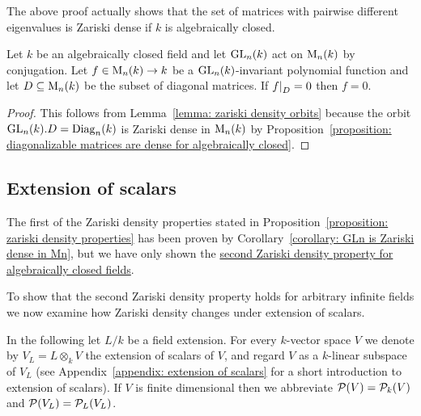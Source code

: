 \begin{remark}
  The above proof actually shows that the set of matrices with pairwise different eigenvalues is Zariski dense if $k$ is algebraically closed.
\end{remark}




\begin{corollary}
  \label{corollary: second Zariski density property for algebraically closed fields}
  Let $k$ be an algebraically closed field and let $\operatorname{GL}_n(k)$ act on $\operatorname{M}_n(k)$ by conjugation.
  Let $f \in \operatorname{M}_n(k) \to k$ be a $\operatorname{GL}_n(k)$-invariant polynomial function and let $D \subseteq \operatorname{M}_n(k)$ be the subset of diagonal matrices.
  If $\restrict{f}{D} = 0$ then $f = 0$.
\end{corollary}


\begin{proof}
  This follows from Lemma~\ref{lemma: zariski density orbits} because the orbit $\operatorname{GL}_n(k).D = \operatorname{Diag}_n(k)$ is Zariski dense in $\operatorname{M}_n(k)$ by Proposition~\ref{proposition: diagonalizable matrices are dense for algebraically closed}.
\end{proof}





\subsection*{Extension of scalars}


\begin{fluff}
  The first of the Zariski density properties stated in Proposition~\ref{proposition: zariski density properties} has been proven by Corollary~\ref{corollary: GLn is Zariski dense in Mn}, but we have only shown the \hyperref[corollary: second Zariski density property for algebraically closed fields]{second Zariski density property for algebraically closed fields}.
  
  To show that the second Zariski density property holds for arbitrary infinite fields we now examine how Zariski density changes under extension of scalars.
\end{fluff}


\begin{conventions}
  In the following let $L/k$ be a field extension.
  For every $k$-vector space $V$ we denote by $V_L = L \otimes_k V$ the extension of scalars of $V$, and regard $V$ as a $k$-linear subspace of $V_L$ (see Appendix~\ref{appendix: extension of scalars} for a short introduction to extension of scalars).
  If $V$ is finite dimensional then we abbreviate $\mathcal{P}(V) = \mathcal{P}_k(V)$ and $\mathcal{P}(V_L) = \mathcal{P}_L(V_L)$.
\end{conventions}


